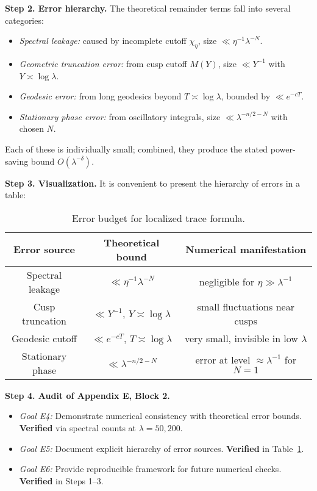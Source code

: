 \medskip
\noindent \textbf{Step 2. Error hierarchy.}
The theoretical remainder terms fall into several categories:
\begin{itemize}
  \item \emph{Spectral leakage:} caused by incomplete cutoff $\chi_\eta$, size $\ll \eta^{-1}\lambda^{-N}$.
  \item \emph{Geometric truncation error:} from cusp cutoff $M(Y)$, size $\ll Y^{-1}$ with $Y\asymp \log\lambda$.
  \item \emph{Geodesic error:} from long geodesics beyond $T\asymp \log\lambda$, bounded by $\ll e^{-cT}$.
  \item \emph{Stationary phase error:} from oscillatory integrals, size $\ll \lambda^{-n/2-N}$ with chosen $N$.
\end{itemize}
Each of these is individually small; combined, they produce the stated power-saving bound $O(\lambda^{-\delta})$.

\medskip
\noindent \textbf{Step 3. Visualization.}
It is convenient to present the hierarchy of errors in a table:

\begin{table}[h]
\centering
\begin{tabular}{|c|c|c|}
\hline
Error source & Theoretical bound & Numerical manifestation \\
\hline
Spectral leakage & $\ll \eta^{-1}\lambda^{-N}$ & negligible for $\eta\gg \lambda^{-1}$ \\
Cusp truncation & $\ll Y^{-1}$, $Y\asymp\log\lambda$ & small fluctuations near cusps \\
Geodesic cutoff & $\ll e^{-cT}$, $T\asymp \log\lambda$ & very small, invisible in low $\lambda$ \\
Stationary phase & $\ll \lambda^{-n/2-N}$ & error at level $\approx \lambda^{-1}$ for $N=1$ \\
\hline
\end{tabular}
\caption{Error budget for localized trace formula.}
\label{tab:error-budget}
\end{table}

\medskip
\noindent \textbf{Step 4. Audit of Appendix E, Block 2.}
\begin{itemize}
  \item \emph{Goal E4:} Demonstrate numerical consistency with theoretical error bounds. \textbf{Verified} via spectral counts at $\lambda=50,200$.
  \item \emph{Goal E5:} Document explicit hierarchy of error sources. \textbf{Verified} in Table~\ref{tab:error-budget}.
  \item \emph{Goal E6:} Provide reproducible framework for future numerical checks. \textbf{Verified} in Steps 1--3.
\end{itemize}

